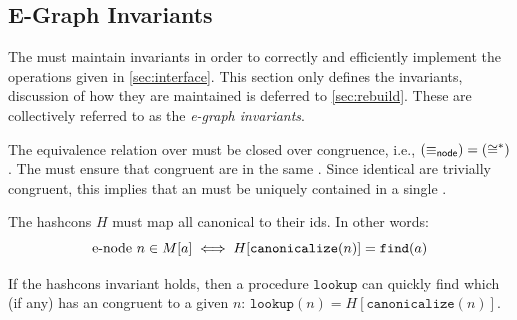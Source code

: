 \subsection{E-Graph Invariants}
\label{sec:invariants}

The \egraph must maintain invariants in order to
  correctly and efficiently implement the operations given in \autoref{sec:interface}.
This section only defines the invariants,
  discussion of how they are maintained is deferred to \autoref{sec:rebuild}.
These are collectively referred to as the \textit{e-graph invariants}.

\begin{definition}
  \label{def:cong-inv}
  The equivalence relation over \enodes must be closed over congruence,
    i.e., $(\equiv_{\sf node}) = (\cong^{*})$.
  The \egraph must ensure that congruent \enodes are in the same \eclass.
  Since identical \enodes are trivially congruent,
   this implies that an \enode must be uniquely contained in a single \eclass.
\end{definition}

\begin{definition}
  \label{def:hash-inv}
  The hashcons $H$ must map all canonical \enodes to their \eclass ids.
  In other words:
  $$ \mbox{e-node}\ n \in M[a] \iff H[\texttt{canonicalize}(n)] = \texttt{find}(a) $$

  If the hashcons invariant holds, then a procedure $\texttt{lookup}$
    can quickly find which \eclass (if any) has an \enode congruent to a given \enode $n$:
  $\texttt{lookup}(n) = H[\texttt{canonicalize}(n)]$.
\end{definition}



